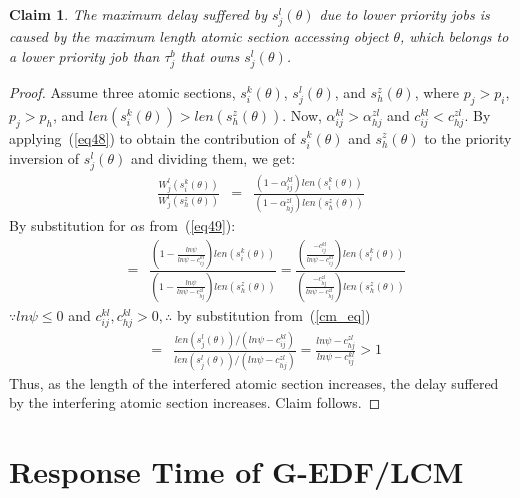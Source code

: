 \documentclass[12pt,english]{report}
\newtheorem{clm}{Claim}
\newtheorem{proof}{Proof}
\begin{document}
\begin{clm}
\label{max_pri_inv}
The maximum delay suffered by $s_j^l(\theta)$ due to lower priority jobs is caused by the maximum length atomic section accessing object $\theta$, which belongs to a lower priority job than $\tau_j^b$ that owns $s_j^l(\theta)$.
\end{clm}

\begin{proof}\normalfont
Assume three atomic sections, $s_i^k(\theta)$, $s_j^l(\theta)$, and $s_h^z(\theta)$, where $p_j>p_i$, $p_j>p_h$, and $len(s_i^k(\theta))>len(s_h^z(\theta))$. Now, $\alpha_{ij}^{kl}>\alpha_{hj}^{zl}$ and $c_{ij}^{kl}<c_{hj}^{zl}$. By applying~(\ref{eq48}) to obtain the contribution of $s_i^k(\theta)$ and $s_h^z(\theta)$ to the priority inversion of $s_j^l(\theta)$ and dividing them, we get:
\begin{eqnarray*}
\frac{W_{j}^{l}(s_{i}^{k}(\theta))}{W_{j}^{l}(s_{h}^{z}(\theta))} & = & \frac{\left(1-\alpha_{ij}^{kl}\right)len(s_{i}^{k}(\theta))}{\left(1-\alpha_{hj}^{zl}\right)len(s_{h}^{z}(\theta))}
\end{eqnarray*}
By substitution for $\alpha$s from~(\ref{eq49}):
\begin{eqnarray*}
 & = & \frac{(1-\frac{ln\psi}{ln\psi-c_{ij}^{kl}})len(s_{i}^{k}(\theta))}{(1-\frac{ln\psi}{ln\psi-c_{hj}^{zl}})len(s_{h}^{z}(\theta))}
  =  \frac{(\frac{-c_{ij}^{kl}}{ln\psi-c_{ij}^{kl}})len(s_{i}^{k}(\theta))}{(\frac{-c_{hj}^{zl}}{ln\psi-c_{hj}^{zl}})len(s_{h}^{z}(\theta))}\end{eqnarray*}
$\because ln\psi \le 0$ and $c_{ij}^{kl},c_{hj}^{kl} > 0, \therefore$ by substitution from~(\ref{cm_eq})
\begin{eqnarray*}
 & = & \frac{len(s_{j}^{l}(\theta))/(ln\psi-c_{ij}^{kl})}{len(s_{j}^{l}(\theta))/(ln\psi-c_{hj}^{zl})}
  =  \frac{ln\psi-c_{hj}^{zl}}{ln\psi-c_{ij}^{kl}}>1\end{eqnarray*}
Thus, as the length of the interfered atomic section increases, the delay suffered by the interfering atomic section increases. Claim follows.
\end{proof}


\section{\label{response g-edf/lcm}Response Time of G-EDF/LCM}

\end{document}

